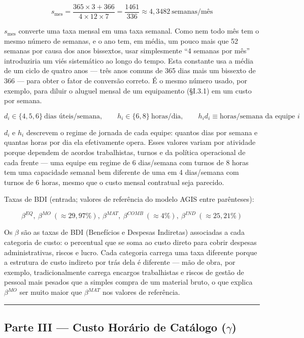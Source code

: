\documentclass[
  10pt,
]{article}
\begin{document}
\[s_{\text{mes}} = \frac{365\times3+366}{4\times12\times7} = \frac{1461}{336} \approx 4{,}3482 \ \text{semanas/mês}\]

\(s_{\text{mes}}\) converte uma taxa mensal em uma taxa semanal. Como
nem todo mês tem o mesmo número de semanas, e o ano tem, em média, um
pouco mais que 52 semanas por causa dos anos bissextos, usar
simplesmente ``4 semanas por mês'' introduziria um viés sistemático ao
longo do tempo. Esta constante usa a média de um ciclo de quatro anos
--- três anos comuns de 365 dias mais um bissexto de 366 --- para obter
o fator de conversão correto. É o mesmo número usado, por exemplo, para
diluir o aluguel mensal de um equipamento (§I.3.1) em um custo por
semana.

\[d_i \in \{4,5,6\}\ \text{dias úteis/semana}, \qquad h_i \in \{6,8\}\ \text{horas/dia}, \qquad h_id_i \equiv \text{horas/semana da equipe }i\]

\(d_i\) e \(h_i\) descrevem o regime de jornada de cada equipe: quantos
dias por semana e quantas horas por dia ela efetivamente opera. Esses
valores variam por atividade porque dependem de acordos trabalhistas,
turnos e da política operacional de cada frente --- uma equipe em regime
de 6 dias/semana com turnos de 8 horas tem uma capacidade semanal bem
diferente de uma em 4 dias/semana com turnos de 6 horas, mesmo que o
custo mensal contratual seja parecido.

Taxas de BDI (entrada; valores de referência do modelo AGIS entre
parênteses):

\[\beta^{EQ},\ \beta^{MO}\ (\approx29{,}97\%),\ \beta^{MAT},\ \beta^{COMB}\ (\approx4\%),\ \beta^{IND}\ (\approx25{,}21\%)\]

Os \(\beta\) são as taxas de BDI (Benefícios e Despesas Indiretas)
associadas a cada categoria de custo: o percentual que se soma ao custo
direto para cobrir despesas administrativas, riscos e lucro. Cada
categoria carrega uma taxa diferente porque a estrutura de custo
indireto por trás dela é diferente --- mão de obra, por exemplo,
tradicionalmente carrega encargos trabalhistas e riscos de gestão de
pessoal mais pesados que a simples compra de um material bruto, o que
explica \(\beta^{MO}\) ser muito maior que \(\beta^{MAT}\) nos valores
de referência.

\begin{center}\rule{0.5\linewidth}{0.5pt}\end{center}

\hypertarget{parte-iii-custo-horuxe1rio-de-catuxe1logo-gamma}{%
\subsection{\texorpdfstring{Parte III --- Custo Horário de Catálogo
(\(\gamma\))}{Parte III --- Custo Horário de Catálogo (\textbackslash gamma)}}\label{parte-iii-custo-horuxe1rio-de-catuxe1logo-gamma}}
\end{document}
